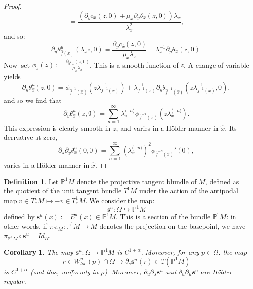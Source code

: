 \documentclass[a4paper]{article}
\newtheorem{corollary}[theorem]{Corollary}
\theoremstyle{definition}
\newtheorem{definition}{Definition}[section]
\begin{document}
\begin{proof}
$$ = \frac{\left(\partial_y c_{\widehat{x}}(z,0) + \mu_x \partial_y \theta_{\widehat{x}}(z,0)\right) \lambda_x}{\lambda_x^2}, $$
and so:
$$ \partial_y \theta_{\widehat{f}({\widehat{x}})}^u(\lambda_x z,0) = \frac{\partial_y c_{\widehat{x}}(z,0)}{\mu_x \lambda_x} + \lambda_x^{-1} \partial_y \theta_{\widehat{x}}(z,0) .$$
Now, set $\phi_{\widehat{x}}(z) := \frac{\partial_y c_{\widehat{x}}(z,0)}{\mu_x \lambda_x}$. This is a smooth function of $z$. A change of variable yields
$$ \partial_y \theta_{{\widehat{x}}}^u(z,0) = \phi_{\widehat{f}^{-1}({\widehat{x}})}(z \lambda_{f^{-1}(x)}^{-1}) + \lambda_{f^{-1}(x)}^{-1} \partial_y \theta_{\widehat{f}^{-1}({\widehat{x}})}(z \lambda_{f^{-1}(x)}^{-1},0)  ,$$
and so we find that
$$ \partial_y \theta_{\widehat{x}}^u(z,0) = \sum_{n=1}^\infty \lambda_x^{\langle -n \rangle} \phi_{\widehat{f}^{-n}({\widehat{x}})}(z \lambda_x^{\langle -n \rangle}) .$$
This expression is clearly smooth in $z$, and varies in a Hölder manner in ${\widehat{x}}$. Its derivative at zero,
$$ \partial_z \partial_y \theta_{\widehat{x}}^u(0,0) = \sum_{n=1}^\infty (\lambda_x^{\langle -n \rangle})^2 \phi_{\widehat{f}^{-n}({\widehat{x}})}'(0) ,$$
varies in a Hölder manner in ${\widehat{x}}$.
\end{proof}

\begin{definition}
Let $\mathbb{P}^1 M$ denote the projective tangent blundle of $M$, defined as the quotient of the unit tangent bundle $T^1 M$ under the action of the antipodal map $v \in T^1_x M \mapsto -v \in T^1_x M$. We consider the map:
$$ \mathbf{s}^u : \Omega \hookrightarrow \mathbb{P}^1 M $$
defined by $\mathbf{s}^u(x) := E^u(x) \in \mathbb{P}^1 M$. This is a section of the bundle $\mathbb{P}^1 M$: in other words, if $\pi_{\mathbb{P}^1 M} : \mathbb{P}^1 M \rightarrow M$ denotes the projection on the basepoint, we have $\pi_{\mathbb{P}^1M} \circ \mathbf{s}^u = Id_{\Omega}$.
\end{definition}

\begin{corollary}
The map $\mathbf{s}^u : \Omega \rightarrow \mathbb{P}^1 M$ is $C^{1+\alpha}$. Moreover, for any $p \in \Omega$, the map
$$ r \in W^u_{loc}(p) \cap \Omega \mapsto \partial_s \mathbf{s}^u(r) \in T(\mathbb{P}^1 M) $$
is $C^{1+\alpha}$ (and this, uniformly in $p$). Moreover, $\partial_u \partial_s \mathbf{s}^u$ and $\partial_u \partial_u \mathbf{s}^u$ are Hölder regular.
\end{corollary}
\end{document}
